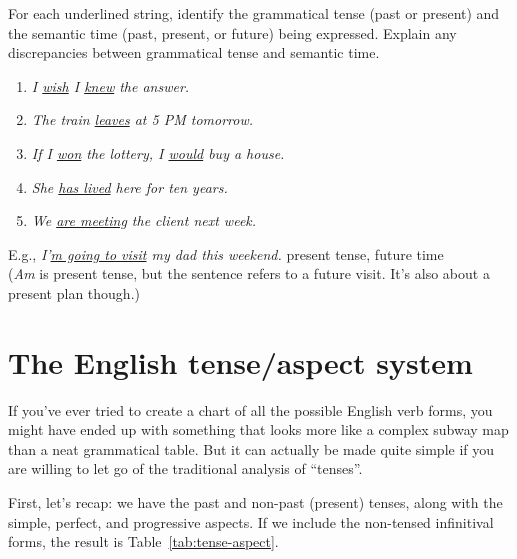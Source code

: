 \begin{tcolorbox}[title=Exercise: Tense and Time, colback=white, colframe=orange!75!black, fonttitle=\bfseries]
For each underlined string, identify the grammatical tense (past or present) and the semantic time (past, present, or future) being expressed. Explain any discrepancies between grammatical tense and semantic time.

\begin{enumerate}[nosep]
    \item \textit{I \uline{wish} I \uline{knew} the answer.}
    \item \textit{The train \uline{leaves} at 5 PM tomorrow.}
    \item \textit{If I \uline{won} the lottery, I \uline{would} buy a house.}
    \item \textit{She \uline{has lived} here for ten years.}
    \item \textit{We \uline{are meeting} the client next week.}
\end{enumerate}

E.g., \textit{I'\uline{m going to visit} my dad this weekend.}  present tense, future time\\
(\textit{Am} is present tense, but the sentence refers to a future visit. It's also about a present plan though.)
\end{tcolorbox}

\section{The English tense/aspect system}\label{sec:tense-aspect}

If you've ever tried to create a chart of all the possible English verb forms, you might have ended up with something that looks more like a complex subway map than a neat grammatical table. But it can actually be made quite simple if you are willing to let go of the traditional analysis of ``tenses''.

First, let's recap: we have the past and non-past (present) tenses, along with the simple, perfect, and progressive aspects. If we include the non-tensed infinitival forms, the result is Table~\ref{tab:tense-aspect}.


